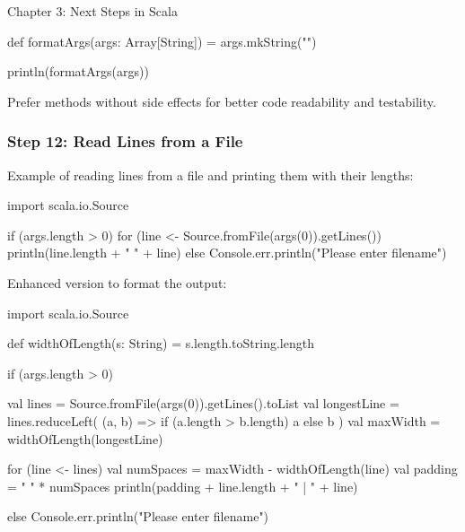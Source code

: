 \begin{notes}{Chapter 3: Next Steps in Scala}
\begin{highlight}
\begin{code}[Scala]
    def formatArgs(args: Array[String]) = args.mkString("\n")

    println(formatArgs(args))
    \end{code}

    \end{highlight}

    Prefer methods without side effects for better code readability and testability.

    \subsubsection*{Step 12: Read Lines from a File}

    Example of reading lines from a file and printing them with their lengths:

    \begin{highlight}

    \begin{code}[Scala]
    import scala.io.Source

    if (args.length > 0) {
        for (line <- Source.fromFile(args(0)).getLines())
            println(line.length + " " + line)
    } else {
        Console.err.println("Please enter filename")
    }
    \end{code}

    \end{highlight}

    Enhanced version to format the output:

    \begin{highlight}

    \begin{code}[Scala]
    import scala.io.Source

    def widthOfLength(s: String) = s.length.toString.length

    if (args.length > 0) {
        val lines = Source.fromFile(args(0)).getLines().toList
        val longestLine = lines.reduceLeft(
            (a, b) => if (a.length > b.length) a else b
        )
        val maxWidth = widthOfLength(longestLine)

        for (line <- lines) {
            val numSpaces = maxWidth - widthOfLength(line)
            val padding = " " * numSpaces
            println(padding + line.length + " | " + line)
        }
    } else {
        Console.err.println("Please enter filename")
    }
    \end{code}

    \end{highlight}
\end{notes}

